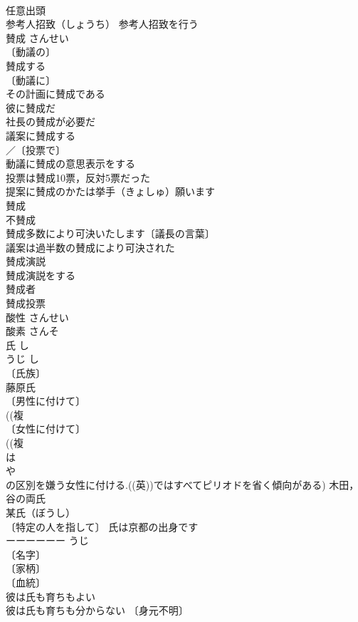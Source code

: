 \documentclass[8pt]{extreport}
\begin{document}
\begin{CJK}{UTF8}{min}
\\	任意出頭　
\\	参考人招致（しょうち） 参考人招致を行う 
\\	賛成	さんせい	
\\	〔動議の〕
\\	賛成する 
\\	〔動議に〕
\\	その計画に賛成である 
\\	彼に賛成だ 
\\	社長の賛成が必要だ 
\\	議案に賛成する 
\\	／〔投票で〕
\\	動議に賛成の意思表示をする 
\\	投票は賛成10票，反対5票だった 
\\	提案に賛成のかたは挙手（きょしゅ）願います 
\\	賛成 
\\	不賛成 
\\	賛成多数により可決いたします〔議長の言葉〕 
\\	議案は過半数の賛成により可決された 
\\	賛成演説 
\\	賛成演説をする 
\\	賛成者 
\\	賛成投票 
\\	酸性	さんせい	
\\	酸素	さんそ	
\\	氏	し　
\\	うじ	し 
\\	〔氏族〕
\\	藤原氏 
\\	〔男性に付けて〕
\\	((複
\\	〔女性に付けて〕
\\	((複
\\	は
\\	や
\\	の区別を嫌う女性に付ける.((英))ではすべてピリオドを省く傾向がある) 木田，谷の両氏 
\\	某氏（ぼうし） 
\\	〔特定の人を指して〕 氏は京都の出身です 
\\	ーーーーーー うじ 
\\	〔名字〕
\\	〔家柄〕
\\	〔血統〕
\\	彼は氏も育ちもよい 
\\	彼は氏も育ちも分からない 〔身元不明〕

\end{CJK}
\end{document}
